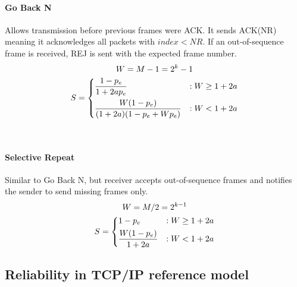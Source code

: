 \documentclass{form}
\begin{document}
\begin{minipage}[c]{0.58\textwidth}
    \begin{minipage}[t]{0.60\linewidth}
        \paragraph{Go Back N}
        Allows transmission before previous frames were ACK. It sends ACK(NR) meaning it acknowledges all packets with $index < NR$.
        If an out-of-sequence frame is received, REJ is sent with the expected frame number.
        \begin{gather*}
            W = M-1 = 2^k-1 \\
            S = \begin{dcases}
                    \frac{1-p_e}{1+2ap_e}               & : W \geq 1+2a \\
                    \frac{W(1-p_e)}{(1+2a)(1-p_e+Wp_e)} & : W < 1+2a
                \end{dcases}
        \end{gather*}
    \end{minipage}~
    \begin{minipage}[t]{0.38\linewidth}
        \paragraph{Selective Repeat}
        Similar to Go Back N, but receiver accepts out-of-sequence frames and notifies the sender to send missing frames only.
        \begin{gather*}
            W = M/2 = 2^{k-1} \\
            S = \begin{dcases}
                1-p_e                 & : W \geq 1+2a \\
                \frac{W(1-p_e)}{1+2a} & : W < 1+2a
            \end{dcases}
        \end{gather*}
    \end{minipage}

    \subsection*{Reliability in TCP/IP reference model}
    


\end{minipage}
\end{document}
